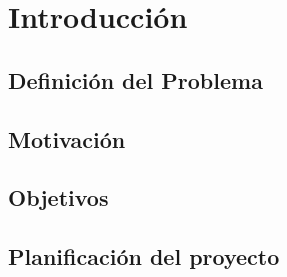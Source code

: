 \chapter{Introducción}
\section{Definición del Problema}   
\section{Motivación}
\section{Objetivos}
\section{Planificación del proyecto}
